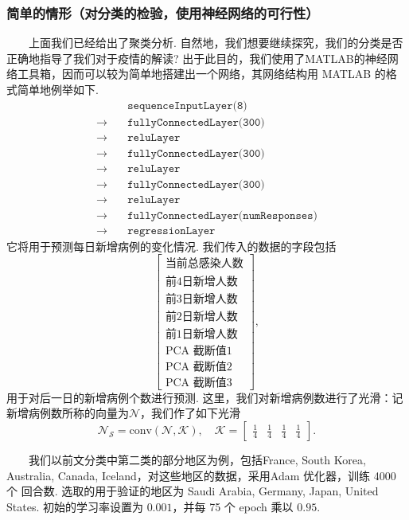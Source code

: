 \documentclass[a4paper, titlepage]{article}
\begin{document}
	\subsubsection*{简单的情形（对分类的检验，使用神经网络的可行性）}
	　　上面我们已经给出了聚类分析. 自然地，我们想要继续探究，我们的分类是否正确地指导了我们对于疫情的解读? 出于此目的，我们使用了MATLAB的神经网络工具箱，因而可以较为简单地搭建出一个网络，其网络结构用 MATLAB 的格式简单地例举如下.
	\begin{align*}
		&\texttt{sequenceInputLayer(8)}\\
    	\rightarrow\quad&\texttt{fullyConnectedLayer(300)}\\
    	\rightarrow\quad&\texttt{reluLayer}\\
    	\rightarrow\quad&\texttt{fullyConnectedLayer(300)}\\
    	\rightarrow\quad&\texttt{reluLayer}\\
    	\rightarrow\quad&\texttt{fullyConnectedLayer(300)}\\
    	\rightarrow\quad&\texttt{reluLayer}\\
    	\rightarrow\quad&\texttt{fullyConnectedLayer(numResponses)}\\
    	\rightarrow\quad&\texttt{regressionLayer}
	\end{align*}
	它将用于预测每日新增病例的变化情况. 我们传入的数据的字段包括
	\[
	\begin{bmatrix}
		\text{当前总感染人数}\\
		\text{前4日新增人数}\\
		\text{前3日新增人数}\\
		\text{前2日新增人数}\\
		\text{前1日新增人数}\\
		\text{PCA 截断值1}\\
		\text{PCA 截断值2}\\
		\text{PCA 截断值3}
	\end{bmatrix},
	\]
	用于对后一日的新增病例个数进行预测. 这里，我们对新增病例数进行了光滑：记新增病例数所称的向量为$\mathcal{N}$，我们作了如下光滑
	\[
		\mathcal{N}_{\mathcal{S}} = \text{conv}(\mathcal{N},\mathcal{K}), \quad \mathcal{K} = \begin{bmatrix}
			\displaystyle\frac{1}{4}&\displaystyle\frac{1}{4}&\displaystyle\frac{1}{4}&\displaystyle\frac{1}{4}
	\end{bmatrix}.
	\]

	　　我们以前文分类中第二类的部分地区为例，包括France, South Korea, Australia, Canada, Iceland，对这些地区的数据，采用Adam 优化器，训练 4000 个 回合数. 选取的用于验证的地区为 Saudi Arabia, Germany, Japan, United States. 初始的学习率设置为 $0.001$，并每 75 个 epoch 乘以 $0.95$.
\end{document}
